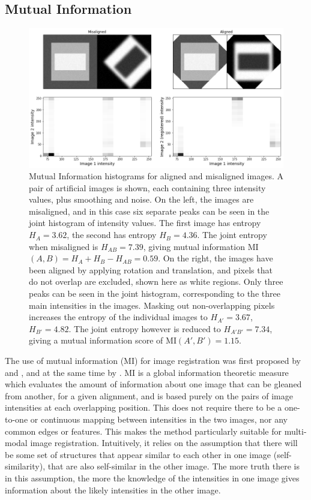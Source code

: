 \documentclass{report}
\begin{document}
\subsection{Mutual Information}
\begin{figure}
\centering
\includegraphics[width = 5.5 in]{MI_joint_histogram.png}
\caption{Mutual Information histograms for aligned and misaligned images. A pair of artificial images is shown, each containing three intensity values, plus smoothing and noise. On the left, the images are misaligned, and in this case six separate peaks can be seen in the joint histogram of intensity values. The first image has entropy $H_A=3.62$, the second has entropy $H_B=4.36$. The joint entropy when misaligned is $H_{AB}=7.39$, giving mutual information MI$(A,B)=H_A+H_B-H_{AB}=0.59$. On the right, the images have been aligned by applying rotation and translation, and pixels that do not overlap are excluded, shown here as white regions. Only three peaks can be seen in the joint histogram, corresponding to the three main intensities in the images. Masking out non-overlapping pixels increases the entropy of the individual images to $H_{A'}=3.67$, $H_{B'}=4.82$. The joint entropy however is reduced to $H_{A'B'}=7.34$, giving a mutual information score of MI$(A',B')=1.15$.}
\label{fig:MI_histogram}
\end{figure}

The use of mutual information (MI) for image registration was first proposed by \cite{wells1996multi} and \cite{viola1997alignment}, and at the same time by \cite{maes1997multimodality}. MI is a global information theoretic measure which evaluates the amount of information about one image that can be gleaned from another, for a given alignment, and is based purely on the pairs of image intensities at each overlapping position. This does not require there to be a one-to-one or continuous mapping between intensities in the two images, nor any common edges or features. This makes the method particularly suitable for multi-modal image registration. Intuitively, it relies on the assumption that there will be some set of structures that appear similar to each other in one image (self-similarity), that are also self-similar in the other image. The more truth there is in this assumption, the more the knowledge of the intensities in one image gives information about the likely intensities in the other image.
\end{document}
